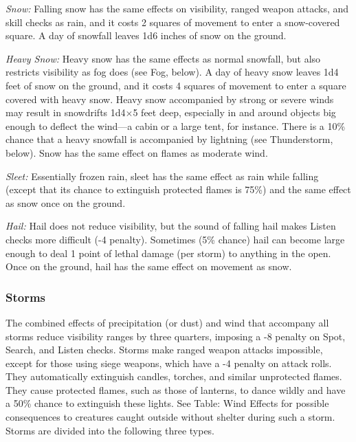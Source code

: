 \documentclass{article}
\begin{document}
\textit{Snow: }Falling snow has the same effects on visibility, ranged weapon attacks, 
and skill checks as rain, and it costs 2 squares of movement to enter a snow-covered 
square. A day of snowfall leaves 1d6 inches of snow on the ground.

\textit{Heavy Snow: }Heavy snow has the same effects as normal snowfall, but also 
restricts visibility as fog does (see Fog, below). A day of heavy snow leaves 1d4 
feet of snow on the ground, and it costs 4 squares of movement to enter a square 
covered with heavy snow. Heavy snow accompanied by strong or severe winds may result 
in snowdrifts 1d4\ensuremath{\times}5 feet deep, especially in and around objects 
big enough to deflect the wind---a cabin or a large tent, for instance. There is 
a 10\% chance that a heavy snowfall is accompanied by lightning (see Thunderstorm, 
below). Snow has the same effect on flames as moderate wind.

\textit{Sleet: }Essentially frozen rain, sleet has the same effect as rain while 
falling (except that its chance to extinguish protected flames is 75\%) and the 
same effect as snow once on the ground. 

\textit{Hail: }Hail does not reduce visibility, but the sound of falling hail makes 
Listen checks more difficult (-4 penalty). Sometimes (5\% chance) hail can become 
large enough to deal 1 point of lethal damage (per storm) to anything in the open. 
Once on the ground, hail has the same effect on movement as snow.

\subsubsection*{\textbf{Storms}}

The combined effects of precipitation (or dust) and wind that accompany all storms 
reduce visibility ranges by three quarters, imposing a -8 penalty on Spot, Search, 
and Listen checks. Storms make ranged weapon attacks impossible, except for those 
using siege weapons, which have a -4 penalty on attack rolls. They automatically 
extinguish candles, torches, and similar unprotected flames. They cause protected 
flames, such as those of lanterns, to dance wildly and have a 50\% chance to extinguish 
these lights. See Table: Wind Effects for possible consequences to creatures caught 
outside without shelter during such a storm. Storms are divided into the following 
three types. 
\end{document}
